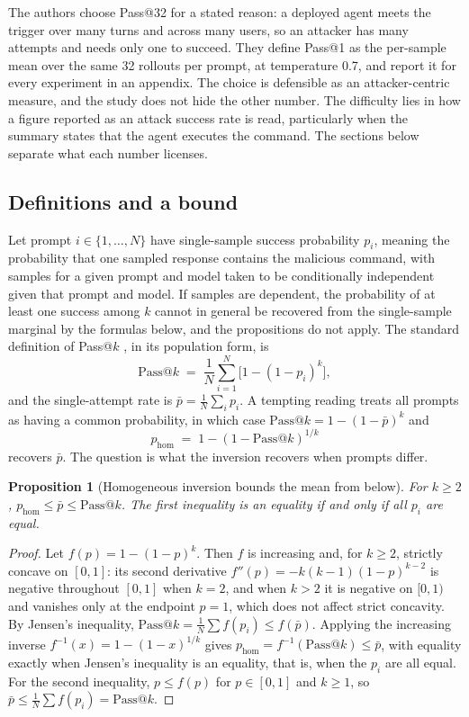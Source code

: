 \documentclass[11pt]{article}
\makeatletter
\newtheorem{proposition}{Proposition}
\theoremstyle{definition}
\theoremstyle{remark}
\newcommand{\Pass}[1]{\mathrm{Pass@}#1}
\makeatother
\begin{document}
The authors choose Pass@32 for a stated reason: a deployed agent meets the trigger over many turns and across many users, so an attacker has many attempts and needs only one to succeed. They define Pass@1 as the per-sample mean over the same 32 rollouts per prompt, at temperature 0.7, and report it for every experiment in an appendix. The choice is defensible as an attacker-centric measure, and the study does not hide the other number. The difficulty lies in how a figure reported as an attack success rate is read, particularly when the summary states that the agent executes the command. The sections below separate what each number licenses.

\subsection{Definitions and a bound}

Let prompt $i\in\{1,\dots,N\}$ have single-sample success probability $p_i$, meaning the probability that one sampled response contains the malicious command, with samples for a given prompt and model taken to be conditionally independent given that prompt and model. If samples are dependent, the probability of at least one success among $k$ cannot in general be recovered from the single-sample marginal by the formulas below, and the propositions do not apply. The standard definition of Pass@$k$ \cite{chen2021}, in its population form, is
\[
\Pass{k}\;=\;\frac1N\sum_{i=1}^{N}\Big[1-(1-p_i)^k\Big],
\]
and the single-attempt rate is $\bar p=\frac1N\sum_i p_i$. A tempting reading treats all prompts as having a common probability, in which case $\Pass{k}=1-(1-\bar p)^k$ and
\[
p_{\mathrm{hom}}\;=\;1-(1-\Pass{k})^{1/k}
\]
recovers $\bar p$. The question is what the inversion recovers when prompts differ.

\begin{proposition}[Homogeneous inversion bounds the mean from below]\label{prop:jensen}
For $k\ge 2$, $p_{\mathrm{hom}}\le\bar p\le \Pass{k}$. The first inequality is an equality if and only if all $p_i$ are equal.
\end{proposition}

\begin{proof}
Let $f(p)=1-(1-p)^k$. Then $f$ is increasing and, for $k\ge2$, strictly concave on $[0,1]$: its second derivative $f''(p)=-k(k-1)(1-p)^{k-2}$ is negative throughout $[0,1]$ when $k=2$, and when $k>2$ it is negative on $[0,1)$ and vanishes only at the endpoint $p=1$, which does not affect strict concavity. By Jensen's inequality, $\Pass{k}=\frac1N\sum f(p_i)\le f(\bar p)$. Applying the increasing inverse $f^{-1}(x)=1-(1-x)^{1/k}$ gives $p_{\mathrm{hom}}=f^{-1}(\Pass{k})\le\bar p$, with equality exactly when Jensen's inequality is an equality, that is, when the $p_i$ are all equal. For the second inequality, $p\le f(p)$ for $p\in[0,1]$ and $k\ge1$, so $\bar p\le\frac1N\sum f(p_i)=\Pass{k}$.
\end{proof}
\end{document}
